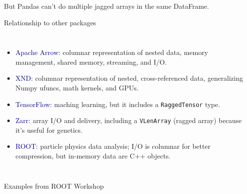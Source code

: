 \documentclass[aspectratio=169]{beamer}
\begin{document}
\begin{frame}{}

But Pandas can't do multiple jagged arrays in the same DataFrame.

\end{frame}

\begin{frame}{Relationship to other packages}
\large
\vspace{0.5 cm}
\begin{columns}
\begin{itemize}\setlength{\itemsep}{0.25 cm}
\item \textcolor{darkblue}{Apache Arrow:} columnar representation of nested data, memory management, shared memory, streaming, and I/O.

\item \textcolor{darkblue}{XND:} columnar representation of nested, cross-referenced data, generalizing Numpy ufuncs, math kernels, and GPUs.

\item \textcolor{darkblue}{TensorFlow:} maching learning, but it includes a {\tt RaggedTensor} type.

\item \textcolor{darkblue}{Zarr:} array I/O and delivery, including a {\tt VLenArray} (ragged array) because it's useful for genetics.

\item \textcolor{darkblue}{ROOT:} particle physics data analysis; I/O is columnar for better compression, but in-memory data are C++ objects.
\end{itemize}
\end{columns}

\vspace{0.5 cm}
\end{frame}

\begin{frame}{}

Examples from ROOT Workshop

\end{frame}



\begin{frame}{}
\end{frame}
\end{document}
